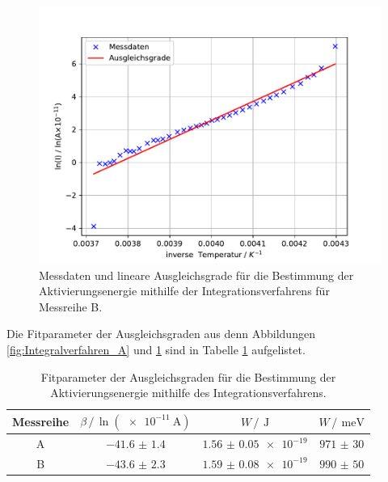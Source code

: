 \begin{figure}
    \centering
    \includegraphics[width= \textwidth,keepaspectratio]{figure/Integralverfahren_B.pdf}
    \caption{Messdaten und lineare Ausgleichsgrade für die Bestimmung der Aktivierungsenergie mithilfe der Integrationsverfahrens für Messreihe B.}
    \label{fig:Integralverfahren_B}
\end{figure}
\FloatBarrier
Die Fitparameter der Ausgleichsgraden aus denn Abbildungen \ref{fig:Integralverfahren_A} und \ref{fig:Integralverfahren_B} sind 
in Tabelle \ref{tab:Fit_params_integtal} aufgelistet.
\begin{table}
    \centering
    \caption{Fitparameter der Ausgleichsgraden für die Bestimmung der Aktivierungsenergie mithilfe des Integrationsverfahrens.}
    \label{tab:Fit_params_integtal}
    \begin{tabular}{c c c c}
        \toprule
        Messreihe&$\beta \,/\, \ln(\SI{e-11}{\ampere})$&$W \,/\,\SI{}{\joule}$&$W \,/\,\SI{}{\milli\eV}$\\
        \midrule
        A&$\num{-41.6(14)}$&$\num{1.56(5)e-19}$&$\num{971(30)}$\\
        B&$\num{-43.6(23)}$&$\num{1.59(8)e-19}$&$\num{990(50)}$\\
        \bottomrule
    \end{tabular}
\end{table}
